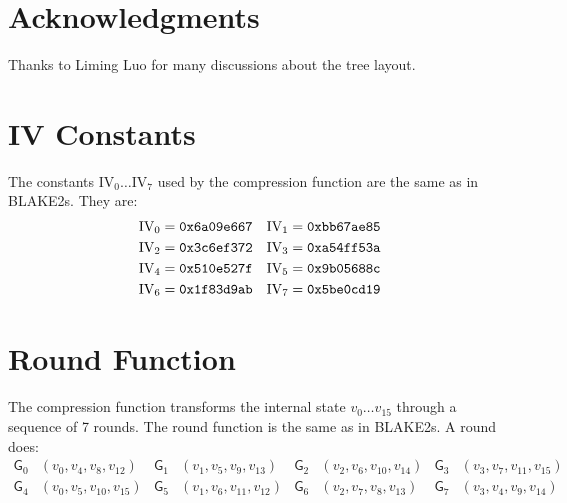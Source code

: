 \documentclass[11pt,notitlepage,a4paper]{article}
\newcommand{\GG}{\mathsf{G}}
\newcommand{\IV}{\text{IV}}
\begin{document}
\section*{Acknowledgments}\label{sec:acknowledgments}

Thanks to Liming Luo for many discussions about the tree layout.




\begin{appendices}

\section{IV Constants}\label{sec:ivconstants}

    The constants $\IV_0 \ldots \IV_7$ used by the compression function are the
    same as in BLAKE2s. They are:
\begin{align*}
    \IV_0 &= \text{\texttt{0x6a09e667}} &
    \IV_1 &= \text{\texttt{0xbb67ae85}} \\
    \IV_2 &= \text{\texttt{0x3c6ef372}} &
    \IV_3 &= \text{\texttt{0xa54ff53a}} \\
    \IV_4 &= \text{\texttt{0x510e527f}} &
    \IV_5 &= \text{\texttt{0x9b05688c}} \\
    \IV_6 &= \text{\texttt{0x1f83d9ab}} &
    \IV_7 &= \text{\texttt{0x5be0cd19}}
\end{align*}

\section{Round Function}\label{sec:roundfn}

    The compression function transforms the internal state $v_{0} \ldots
    v_{15}$ through a sequence of 7 rounds. The round function is the same as
    in BLAKE2s. A round does:
\begin{align*}
    \GG_{0}&(v_{0}, v_{4}, v_{8}, v_{12}) &
    \GG_{1}&(v_{1}, v_{5}, v_{9}, v_{13}) &
    \GG_{2}&(v_{2}, v_{6}, v_{10}, v_{14}) &
    \GG_{3}&(v_{3}, v_{7}, v_{11}, v_{15}) \\
    \GG_{4}&(v_{0}, v_{5}, v_{10}, v_{15}) &
    \GG_{5}&(v_{1}, v_{6}, v_{11}, v_{12}) &
    \GG_{6}&(v_{2}, v_{7}, v_{8}, v_{13}) &
    \GG_{7}&(v_{3}, v_{4}, v_{9}, v_{14})
\end{align*}


\end{appendices}
\end{document}
